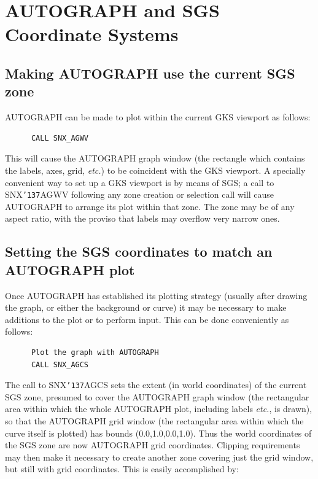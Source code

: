 \documentclass[11pt]{article}
\renewcommand{\_}{{\tt\char'137}}     %
\begin{document}
\section {AUTOGRAPH and SGS Coordinate Systems} \label{coord_sect}

\subsection {Making AUTOGRAPH use the current SGS zone}

AUTOGRAPH can be made to plot within the current GKS viewport as follows:

\begin{verbatim}
      CALL SNX_AGWV
\end{verbatim}

This will cause the AUTOGRAPH graph window (the rectangle which
contains the labels, axes, grid, {\em etc.}) to be coincident with the GKS
viewport. A specially convenient way to set up a GKS viewport is by means of
SGS; a call to SNX\_AGWV following any zone creation or selection call will
cause AUTOGRAPH to arrange its plot within that zone.
The zone may be of any aspect ratio,
with the proviso that labels may overflow very narrow ones.


\subsection {Setting the SGS coordinates to match an AUTOGRAPH plot}

Once AUTOGRAPH has established its plotting strategy (usually
after drawing the graph, or either the background or curve) it
may be necessary to make additions to the plot or to perform input.
This can be done conveniently as follows:

\begin{verbatim}
      Plot the graph with AUTOGRAPH
      CALL SNX_AGCS
\end{verbatim}

The call to SNX\_AGCS sets the extent (in world coordinates) of the
current SGS zone, presumed to cover the AUTOGRAPH graph
window (the rectangular area within which the whole AUTOGRAPH
plot, including labels {\em etc.}, is drawn), so that the AUTOGRAPH
grid window (the rectangular
area within which the curve itself is plotted) has bounds
(0.0,1.0,0.0,1.0).
Thus the world coordinates of
the SGS zone are now AUTOGRAPH grid coordinates.
Clipping requirements may then make it necessary
to create another zone covering just the grid window, but
still with grid coordinates.
This is easily accomplished by:
\end{document}
